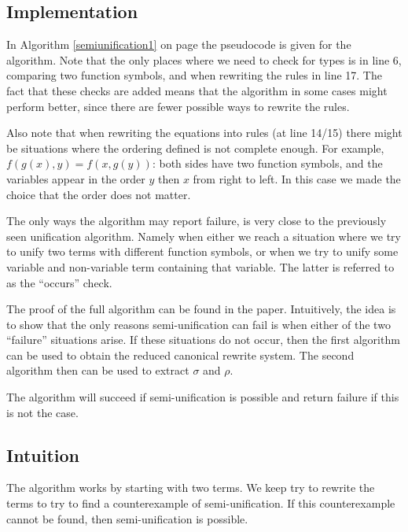 \subsection{Implementation}
In Algorithm \ref{semiunification1} on page \pageref{semiunification1} the pseudocode is given for the algorithm. Note that the only places where we need to check for types is in line 6, comparing two function symbols, and when rewriting the rules in line 17. The fact that these checks are added means that the algorithm in some cases might perform better, since there are fewer possible ways to rewrite the rules.

Also note that when rewriting the equations into rules (at line 14/15) there might be situations where the ordering defined is not complete enough. For example, $f(g(x), y) = f(x, g(y))$: both sides have two function symbols, and the variables appear in the order $y$ then $x$ from right to left. In this case we made the choice that the order does not matter.  

The only ways the algorithm may report failure, is very close to the previously seen unification algorithm. Namely when either we reach a situation where we try to unify two terms with different function symbols, or when we try to unify some variable and non-variable term containing that variable. The latter is referred to as the ``occurs'' check. 

The proof of the full algorithm can be found in the paper\cite{SemiUnification}. Intuitively, the idea is to show that the only reasons semi-unification can fail is when either of the two ``failure'' situations arise. If these situations do not occur, then the first algorithm can be used to obtain the reduced canonical rewrite system. The second algorithm then can be used to extract $\sigma$ and $\rho$.  

The algorithm will succeed if semi-unification is possible and return failure if this is not the case. 

\subsection{Intuition}
The algorithm works by starting with two terms. We keep try to rewrite the terms to try to find a counterexample of semi-unification. If this counterexample cannot be found, then semi-unification is possible. 

